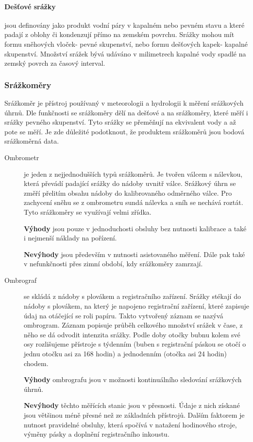 \documentclass[a4paper,12pt]{article}
\begin{document}
\paragraph*{Dešťové srážky}jsou definovány jako produkt vodní páry v kapalném nebo pevném stavu a které padají z oblohy či kondenzují přímo na zemském povrchu. Srážky mohou mít formu sněhových vloček- pevné skupenství, nebo formu dešťových kapek- kapalné skupenství. Množství srážek bývá udáváno v milimetrech kapalné vody spadlé na zemský povrch za časový interval.\cite{wmo} 

\subsubsection{Srážkoměry}
Srážkoměr je přístroj používaný v meteorologii a hydrologii k měření srážkových úhrnů. Dle funkčnosti se srážkoměry dělí na dešťové a na srážkoměry, které měří i srážky pevného skupenství. Tyto srážky se přeměňují na ekvivalent vody a až pote se měří. Je zde důležité podotknout, že produktem srážkoměrů jsou bodová srážkoměrná data.


\begin{description} 
\item[Ombrometr]je jeden z nejjednodušších typů srážkoměrů. Je tvořen válcem s nálevkou, která převádí padající srážky do nádoby uvnitř válce. Srážkový úhrn se změří přelitím obsahu nádoby do kalibrovaného odměrného válce. Pro zachycení sněhu se z ombrometru sundá nálevka a sníh se nechává roztát. Tyto srážkoměry se využívají velmi zřídka.

\textbf{Výhody} jsou pouze v jednoduchosti obsluhy bez nutnosti kalibrace a také i nejmenší náklady na pořízení.
   
\textbf{Nevýhody} jsou především v nutnosti asistovaného měření. Dále pak také v nefunkčnosti přes zimní období, kdy srážkoměry zamrzají. 
\end{description}

\begin{description} 
\item[Ombrograf]se skládá z nádoby s plovákem a registračního zařízení. Srážky stékají do nádoby s plovákem, na který je napojeno registrační zařízení, které zapisuje údaj na otáčející se roli papíru. Takto vytvořený záznam se nazývá ombrogram. Záznam popisuje průběh celkového množství srážek v čase, z něho se dá odvodit intenzita srážky. Podle doby otočky bubnu kolem své osy rozlišujeme přístroje s týdenním (buben s registrační páskou se otočí o jednu otočku asi za 168 hodin) a jednodenním (otočka asi 24 hodin) chodem.\cite{chmu_navod}

\textbf{Výhody} ombrografu jsou v možnosti kontinuálního sledování srážkových úhrnů.

\textbf{Nevýhody} těchto měřících stanic jsou v přesnosti. Údaje z nich získané jsou většinou méně přesné než ze základních přístrojů. Dalším faktorem je nutnost pravidelné obsluhy, která spočívá v natažení hodinového stroje, výměny pásky a doplnění registračního inkoustu.
\end{description}
\end{document}
